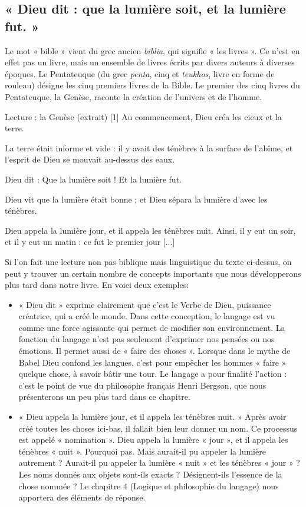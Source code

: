 \subsection{« Dieu dit : que la lumière soit, et la lumière fut. »}
Le mot « bible » vient du grec ancien \textit{biblia}, qui signifie « les livres ». Ce n’est en effet pas un livre, mais un ensemble de livres écrits par divers auteurs à diverses époques. Le Pentateuque (du grec \textit{penta}, cinq et \textit{teukhos}, livre en forme de rouleau) désigne les cinq premiers livres de la Bible. Le premier des cinq livres du Pentateuque, la Genèse, raconte la création de l’univers et de l’homme.
\begin{lecture}{Lecture : la Genèse (extrait)}
[1] Au commencement, Dieu créa les cieux et la terre.\par
[2] La terre était informe et vide : il y avait des ténèbres à la surface de l’abîme, et l’esprit de Dieu se mouvait au-dessus des eaux.\par
[3] Dieu dit : Que la lumière soit ! Et la lumière fut.\par
[4] Dieu vit que la lumière était bonne ; et Dieu sépara la lumière d’avec les ténèbres.\par
[5] Dieu appela la lumière jour, et il appela les ténèbres nuit. Ainsi, il y eut un soir, et il y eut un matin : ce fut le premier jour [...]
\end{lecture}
Si l’on fait une lecture non pas biblique mais linguistique du texte ci-dessus, on peut y trouver un certain nombre de concepts importants que nous développerons plus tard dans notre livre. En voici deux exemples:
\begin{itemize}
\item « Dieu dit » exprime clairement que c’est le Verbe de Dieu, puissance créatrice, qui a créé le monde. Dans cette conception, le langage est vu comme une force agissante qui permet de modifier son environnement. La fonction du langage n’est pas seulement d’exprimer nos pensées ou nos émotions. Il permet aussi de « faire des choses ». Lorsque dans le mythe de Babel Dieu confond les langues, c’est pour empêcher les hommes « faire » quelque chose, à savoir bâtir une tour. Le langage a pour finalité l’action : c’est le point de vue du philosophe français Henri Bergson, que nous présenterons un peu plus tard dans ce chapitre.
\item « Dieu appela la lumière jour, et il appela les ténèbres nuit. » Après avoir créé toutes les choses ici-bas, il fallait bien leur donner un nom. Ce processus est appelé « nomination ». Dieu appela la lumière « jour », et il appela les ténèbres « nuit ». Pourquoi pas. Mais aurait-il pu appeler la lumière autrement ? Aurait-il pu appeler la lumière « nuit » et les ténèbres « jour » ? Les noms donnés aux objets sont-ils exacts ? Désignent-ils l’essence de la chose nommée ? Le chapitre 4 (Logique et philosophie du langage) nous apportera des éléments de réponse.
\end{itemize}
